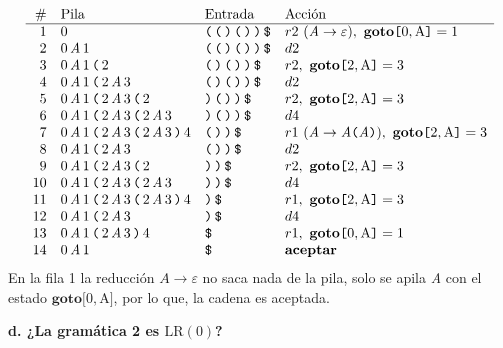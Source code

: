 \documentclass[12pt,letterpaper]{article}
\newcommand{\nt}[1]{\textit{#1}}
\newcommand{\tk}[1]{\texttt{#1}}
\newcommand{\tx}[1]{\text{#1}}
\newcommand{\lrc}{\mathrm{LR(0)}}
\newcommand{\eps}{\varepsilon}
\begin{document}
\begin{enumerate}[label=\arabic*.]
  {\small
  \[
  \begin{array}{r l l l}
    \# & \text{Pila} & \text{Entrada} & \text{Acción} \\ \hline
    1  & 0 & \tk{(\,(\,)\,(\,)\,)\,\$} & r2\ (\nt{A}\to\eps),\ \textbf{goto}\tk{[}0,\tx{A}\tk{]}=1 \\
    2  & 0\,\nt{A}\,1 & \tk{(\,(\,)\,(\,)\,)\,\$} & d2 \\
    3  & 0\,\nt{A}\,1\,\tk{(}\,2 & \tk{(\,)\,(\,)\,)\,\$} & r2,\ \textbf{goto}\tk{[}2,\tx{A}\tk{]}=3 \\
    4  & 0\,\nt{A}\,1\,\tk{(}\,2\,\nt{A}\,3 & \tk{(\,)\,(\,)\,)\,\$} & d2 \\
    5  & 0\,\nt{A}\,1\,\tk{(}\,2\,\nt{A}\,3\,\tk{(}\,2 & \tk{)\,(\,)\,)\,\$} & r2,\ \textbf{goto}\tk{[}2,\tx{A}\tk{]}=3 \\
    6  & 0\,\nt{A}\,1\,\tk{(}\,2\,\nt{A}\,3\,\tk{(}\,2\,\nt{A}\,3 & \tk{)\,(\,)\,)\,\$} & d4 \\
    7  & 0\,\nt{A}\,1\,\tk{(}\,2\,\nt{A}\,3\,\tk{(}\,2\,\nt{A}\,3\,\tk{)}\,4 & \tk{(\,)\,)\,\$} & r1\ (\nt{A}\to\nt{A}\tk{(}\nt{A}\tk{)}),\ \textbf{goto}\tk{[}2,\tx{A}\tk{]}=3 \\
    8  & 0\,\nt{A}\,1\,\tk{(}\,2\,\nt{A}\,3 & \tk{(\,)\,)\,\$} & d2 \\
    9  & 0\,\nt{A}\,1\,\tk{(}\,2\,\nt{A}\,3\,\tk{(}\,2 & \tk{)\,)\,\$} & r2,\ \textbf{goto}\tk{[}2,\tx{A}\tk{]}=3 \\
    10 & 0\,\nt{A}\,1\,\tk{(}\,2\,\nt{A}\,3\,\tk{(}\,2\,\nt{A}\,3 & \tk{)\,)\,\$} & d4 \\
    11 & 0\,\nt{A}\,1\,\tk{(}\,2\,\nt{A}\,3\,\tk{(}\,2\,\nt{A}\,3\,\tk{)}\,4 & \tk{)\,\$} & r1,\ \textbf{goto}\tk{[}2,\tx{A}\tk{]}=3 \\
    12 & 0\,\nt{A}\,1\,\tk{(}\,2\,\nt{A}\,3 & \tk{)\,\$} & d4 \\
    13 & 0\,\nt{A}\,1\,\tk{(}\,2\,\nt{A}\,3\,\tk{)}\,4 & \tk{\$} & r1,\ \textbf{goto}\tk{[}0,\tx{A}\tk{]}=1 \\
    14 & 0\,\nt{A}\,1 & \tk{\$} & \textbf{aceptar}
  \end{array}
  \]
  }
  En la fila 1 la reducción $\nt{A}\to\eps$ no saca nada de la pila, solo se apila \nt{A} con el estado
  $\textbf{goto}\tk{[}0,\tx{A}\tk{]}$, por lo que, la cadena es aceptada.

  \bigskip

  \textbf{\large d. ¿La gramática 2 es $\lrc$?}\\


\end{enumerate}
\end{document}
